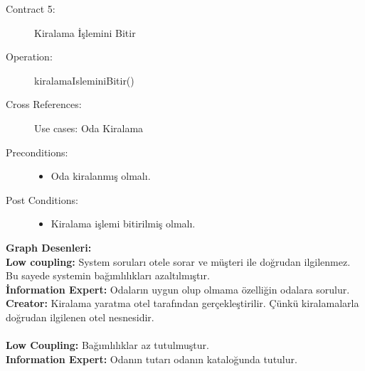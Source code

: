 \documentclass[12pt,a4paper]{report}
\begin{document}
\begin{description}
\item[Contract 5:] Kiralama İşlemini Bitir
\item[Operation:] kiralamaIsleminiBitir()
\item[Cross References:] Use cases: Oda Kiralama
\item[Preconditions:] \hspace{10 mm}
\begin{itemize}
\item Oda kiralanmış olmalı.
\end{itemize}
\item[Post Conditions:] \hspace{10 mm}
\begin{itemize} 
\item Kiralama işlemi bitirilmiş olmalı. \\
\end{itemize}
\end{description}

\newpage
{\bf Graph Desenleri:}\\
{\bf Low coupling:} System soruları otele sorar ve müşteri ile doğrudan ilgilenmez. Bu sayede systemin bağımlılıkları azaltılmıştır. \\
{\bf İnformation Expert:} Odaların uygun olup olmama özelliğin odalara sorulur.\\
{\bf Creator:} Kiralama yaratma otel tarafından gerçekleştirilir. Çünkü kiralamalarla doğrudan ilgilenen otel nesnesidir.\\
\\
{\bf Low Coupling:} Bağımlılıklar az tutulmuştur.\\
{\bf Information Expert:} Odanın tutarı odanın kataloğunda tutulur.\\

\newpage
\end{document}

